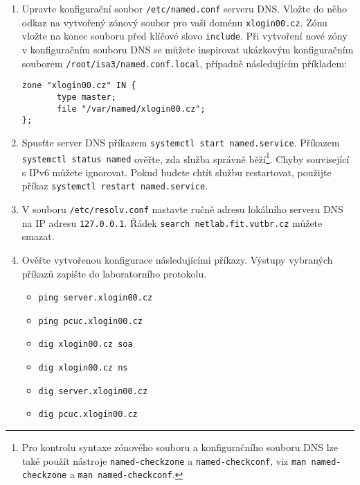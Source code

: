 \documentclass[a4paper,11pt]{article}
\begin{document}
\begin{enumerate}
\item Upravte konfigurační soubor {\tt /etc/named.conf} serveru DNS. Vložte do něho odkaz na vytvořený zónový soubor pro vaši doménu {\tt xlogin00.cz}. Zónu vložte na konec souboru před klíčové slovo {\tt include}. Při vytvoření nové zóny v konfiguračním souboru DNS se můžete inspirovat ukázkovým konfiguračním souborem {\tt /root/isa3/named.conf.local}, případně následujícím příkladem:
\begin{verbatim}
zone "xlogin00.cz" IN {
       type master;
       file "/var/named/xlogin00.cz";
};
\end{verbatim}
  \item Spusťte server DNS příkazem {\tt systemctl start named.service}. Příkazem {\tt systemctl status named} ověřte, zda služba správně běží\footnote{Pro kontrolu syntaxe zónového souboru a konfiguračního souboru DNS lze také použít nástroje {\tt named-checkzone} a {\tt named-checkconf}, viz {\tt man named-checkzone} a {\tt man named-checkconf}.}. Chyby související s IPv6 můžete ignorovat. Pokud budete chtít službu restartovat, použijte příkaz {\tt systemctl restart named.service}.

  \item V souboru {\tt /etc/resolv.conf} nastavte ručně adresu lokálního serveru DNS na IP adresu {\tt 127.0.0.1}. Řádek {\tt search netlab.fit.vutbr.cz} můžete smazat. 
  \item Ověřte vytvořenou konfigurace následujícími příkazy. Výstupy vybraných příkazů zapište do laboratorního protokolu. 
    \begin{itemize}
        \item {\tt ping server.xlogin00.cz}
        \item {\tt ping pcuc.xlogin00.cz}
        \item {\tt dig xlogin00.cz soa}
        \item {\tt dig xlogin00.cz ns}
        \item {\tt dig server.xlogin00.cz}
        \item {\tt dig pcuc.xlogin00.cz}
    \end{itemize}


\end{enumerate}
\end{document}
